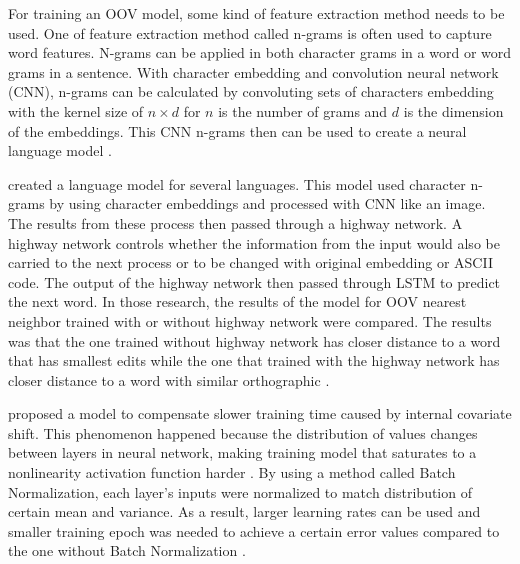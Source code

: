 For training an OOV model, some kind of feature extraction method
needs to be used. One of feature extraction method called n-grams is
often used to capture word features. N-grams can be applied in both
character grams in a word or word grams in a sentence. With character
embedding and convolution neural network (CNN), n-grams can be
calculated by convoluting sets of characters embedding with the kernel
size of $n \times d$ for $n$ is the number of grams and $d$ is the
dimension of the embeddings. This CNN n-grams then can be used to
create a neural language model \citep{character2015kim}.

\cite{character2015kim} created a language model for several
languages. This model used character n-grams by using character
embeddings and processed with CNN like an image. The results from
these process then passed through a highway network. A highway network
controls whether the information from the input would also be carried
to the next process or to be changed with original embedding or ASCII
code. The output of the highway network then passed through LSTM to
predict the next word. In those research, the results of the model for
OOV nearest neighbor trained with or without highway network were
compared. The results was that the one trained without highway network
has closer distance to a word that has smallest edits while the one
that trained with the highway network has closer distance to a word
with similar orthographic \citep{character2015kim}.

\cite{batchnorm:DBLP:journals/corr/IoffeS15} proposed a model to
compensate slower training time caused by internal covariate shift.
This phenomenon happened because the distribution of values changes
between layers in neural network, making training model that saturates
to a nonlinearity activation function harder
\citep{batchnorm:DBLP:journals/corr/IoffeS15}. By using a method
called Batch Normalization, each layer's inputs were normalized to
match distribution of certain mean and variance. As a result, larger
learning rates can be used and smaller training epoch was needed to
achieve a certain error values compared to the one without Batch
Normalization \citep{batchnorm:DBLP:journals/corr/IoffeS15}.